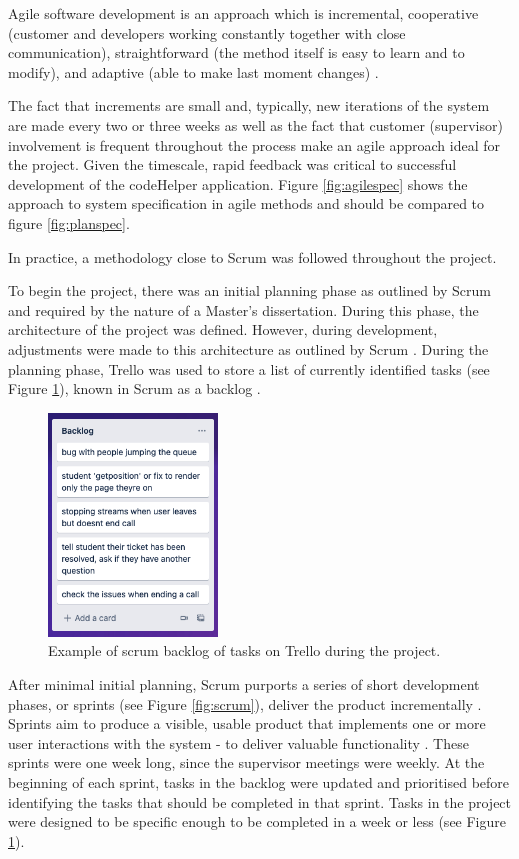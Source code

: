Agile software development is an approach which is incremental, cooperative (customer and developers working constantly together with close communication), straightforward (the method itself is easy to learn and to modify), and adaptive (able to make last moment changes) \cite{Abrahamsson}. 

The fact that increments are small and, typically, new iterations of the system are made every two or three weeks \cite{sommerville} as well as the fact that customer (supervisor) involvement is frequent throughout the process make an agile approach ideal for the project. Given the timescale, rapid feedback was critical to successful development of the codeHelper application. Figure \ref{fig:agilespec} shows the approach to system specification in agile methods and should be compared to figure \ref{fig:planspec}.

In practice, a methodology close to Scrum was followed throughout the project. 

To begin the project, there was an initial planning phase as outlined by Scrum and required by the nature of a Master's dissertation. During this phase, the architecture of the project was defined. However, during development, adjustments were made to this architecture as outlined by Scrum \cite{scrum}. During the planning phase, Trello \cite{trello} was used to store a list of currently identified tasks (see Figure \ref{fig:backlog}), known in Scrum as a backlog \cite{scrum}.

\begin{figure}[H]
    \centering
    \includegraphics[width=0.4\textwidth]{6swengprocess/images/trelloBacklog.png}
    \caption{Example of scrum backlog of tasks on Trello during the project.}
    \label{fig:backlog}
\end{figure}

After minimal initial planning, Scrum purports a series of short development phases, or sprints (see Figure \ref{fig:scrum}), deliver the product incrementally \cite{scrum}. Sprints aim to produce a visible, usable product that implements one or more user interactions with the system - to deliver valuable functionality \cite{scrum}. These sprints were one week long, since the supervisor meetings were weekly. At the beginning of each sprint, tasks in the backlog were updated and prioritised before identifying the tasks that should be completed in that sprint. Tasks in the project were designed to be specific enough to be completed in a week or less (see Figure \ref{fig:backlog}). 

